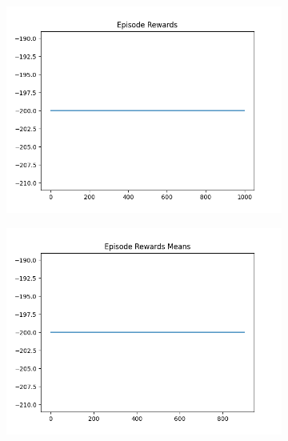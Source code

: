 \begin{figure}[H]
    \centering
    \begin{subfigure}{.47\linewidth}
        \centering
        \includegraphics[width=\textwidth]{mountain/2024-06-15_11-01-53_dqn_mountaincar_episode_rewards.png}
    \end{subfigure}
    \begin{subfigure}{.47\linewidth}
        \centering
        \includegraphics[width=\textwidth]{mountain/2024-06-15_11-01-53_dqn_mountaincar_episode_rewards_means.png}
    \end{subfigure}
    \begin{subfigure}{.47\linewidth}
        \centering

\end{subfigure}
\end{figure}
